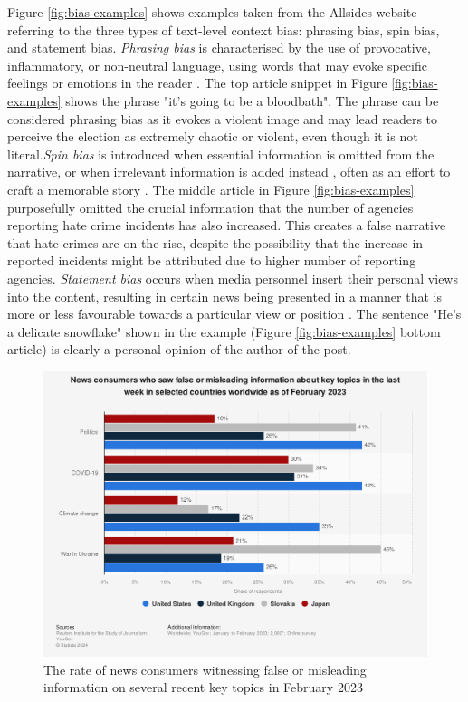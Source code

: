 Figure \ref{fig:bias-examples} shows examples taken from the Allsides website \cite{allsides-media-bias-types} referring to the three types of text-level context bias: phrasing bias, spin bias, and statement bias. \textit{Phrasing bias} is characterised by the use of provocative, inflammatory, or non-neutral language, using words that may evoke specific feelings or emotions in the reader \cite{spinde-2024-taxonomy,hube-2019-neural-biased-language}. The top article snippet in Figure \ref{fig:bias-examples} shows the phrase "it's going to be a bloodbath". The phrase can be considered phrasing bias as it evokes a violent image and may lead readers to perceive the election as extremely chaotic or violent, even though it is not literal.\textit{Spin bias} is introduced when essential information is omitted from the narrative, or when irrelevant information is added instead \cite{spinde-2024-taxonomy}, often as an effort to craft a memorable story \cite{mullainathan-2002-media-bias}. The middle article in Figure \ref{fig:bias-examples} purposefully omitted the crucial information that the number of agencies reporting hate crime incidents has also increased. This creates a false narrative that hate crimes are on the rise, despite the possibility that the increase in reported incidents might be attributed due to higher number of reporting agencies. \textit{Statement bias} occurs when media personnel insert their personal views into the content, resulting in certain news being presented in a manner that is more or less favourable towards a particular view or position \cite{spinde-2024-taxonomy,d-alessio-2000-meta-analysis}. The sentence "He's a delicate snowflake" shown in the example (Figure \ref{fig:bias-examples} bottom article) is clearly a personal opinion of the author of the post.

\begin{figure}[htbp]
    \centering
    \includegraphics[width=0.9\linewidth]{images/statistic_id1317019_consumers-witnessing-false-information-on-certain-topics-worldwide-2023.png}
    \caption{The rate of news consumers witnessing false or misleading information on several recent key topics in February 2023 \cite{reuters-2023-false-info}}
    \label{fig:consumers-witnessing-false-information-on-certain-topics-worldwide-2023}
\end{figure}


